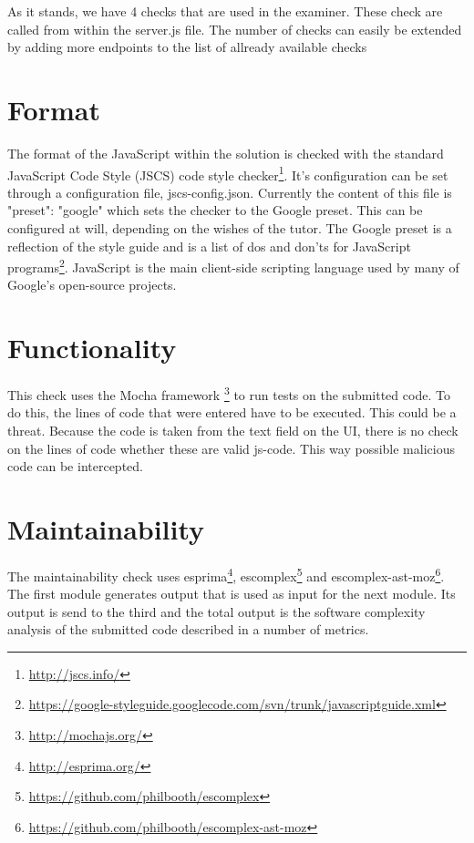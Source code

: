% 

As it stands, we have 4 checks that are used in the \gls{examiner}.
These check are called from within the server.js file.
The number of checks can easily be extended by adding more endpoints to the list
of allready available \glspl{check}

\section{Format}

The format of the JavaScript within the solution is checked with the standard
JavaScript Code Style (JSCS) code style checker\footnote{\url{http://jscs.info/}}.
It's configuration can be set through a configuration file, jscs-config.json.
Currently the content of this file is {"preset": "google"} which sets the checker
to the Google preset.
This can be configured at will, depending on the wishes of the tutor.
The Google preset is a reflection of the style guide and is a list of dos and
don'ts for JavaScript
programs\footnote{\url{https://google-styleguide.googlecode.com/svn/trunk/javascriptguide.xml}}.
JavaScript is the main client-side scripting language used by many of Google's
open-source projects.


\section{Functionality}

This \gls{check} uses the Mocha framework \footnote{\url{http://mochajs.org/}} to run tests on the submitted code.
To do this, the lines of code that were entered have to be executed.
This could be a threat.
Because the code is taken from the text field on the UI, there is no check
on the lines of code whether these are valid \gls{js-code}.
This way possible malicious code can be intercepted.


\section{Maintainability}

The maintainability \gls{check} uses esprima\footnote{\url{http://esprima.org/}},
escomplex\footnote{\url{https://github.com/philbooth/escomplex}} and
escomplex-ast-moz\footnote{\url{https://github.com/philbooth/escomplex-ast-moz}}.
The first module generates output that is used as input for the next module.
Its output is send to the third and the total output is the software
complexity analysis of the submitted code described in a number of metrics.


